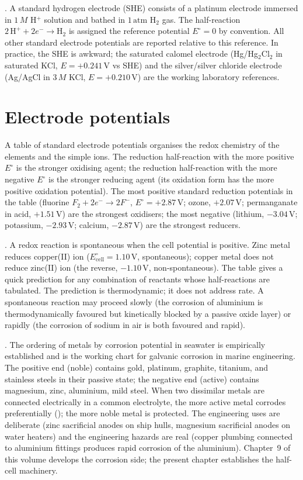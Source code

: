 . A standard hydrogen
electrode (SHE) consists of a platinum electrode immersed in $1\,M$
H$^+$ solution and bathed in $1\,\text{atm}$ H$_2$ gas. The half-reaction
$2\,\text{H}^+ + 2 e^- \to \text{H}_2$ is assigned the reference
potential $E^\circ = 0$ by convention. All other standard electrode
potentials are reported relative to this reference. In practice, the
SHE is awkward; the saturated calomel electrode (Hg/Hg$_2$Cl$_2$ in
saturated KCl, $E = +0.241\,\text{V}$ vs SHE) and the silver/silver
chloride electrode (Ag/AgCl in $3\,M$ KCl, $E = +0.210\,\text{V}$) are
the working laboratory references.

\section{Electrode potentials}

A table of standard electrode potentials organises the redox
chemistry of the elements and the simple ions. The reduction
half-reaction with the more positive $E^\circ$ is the stronger
oxidising agent; the reduction half-reaction with the more negative
$E^\circ$ is the stronger reducing agent (its oxidation form has the
more positive oxidation potential). The most positive standard
reduction potentials in the table (fluorine $F_2 + 2e^- \to 2F^-$,
$E^\circ = +2.87\,\text{V}$; ozone, $+2.07\,\text{V}$; permanganate
in acid, $+1.51\,\text{V}$) are the strongest oxidisers; the most
negative (lithium, $-3.04\,\text{V}$; potassium, $-2.93\,\text{V}$;
calcium, $-2.87\,\text{V}$) are the strongest reducers.

. A redox reaction is spontaneous when
the cell potential is positive. Zinc metal reduces copper(II) ion
($E^\circ_{\text{cell}} = 1.10\,\text{V}$, spontaneous); copper metal
does not reduce zinc(II) ion (the reverse, $-1.10\,\text{V}$,
non-spontaneous). The table gives a quick prediction for any
combination of reactants whose half-reactions are tabulated. The
prediction is thermodynamic; it does not address rate. A spontaneous
reaction may proceed slowly (the corrosion of aluminium is
thermodynamically favoured but kinetically blocked by a passive
oxide layer) or rapidly (the corrosion of sodium in air is both
favoured and rapid).

. The ordering of metals by
corrosion potential in seawater is empirically established and is the
working chart for galvanic corrosion in marine engineering. The
positive end (noble) contains gold, platinum, graphite, titanium, and
stainless steels in their passive state; the negative end (active)
contains magnesium, zinc, aluminium, mild steel. When two dissimilar
metals are connected electrically in a common electrolyte, the more
active metal corrodes preferentially ();
the more noble metal is protected. The engineering uses are
deliberate (zinc sacrificial anodes on ship hulls, magnesium
sacrificial anodes on water heaters) and the engineering hazards are
real (copper plumbing connected to aluminium fittings produces rapid
corrosion of the aluminium). Chapter~9 of this volume develops the
corrosion side; the present chapter establishes the half-cell
machinery.

